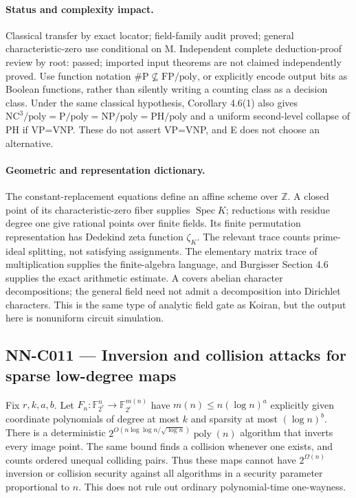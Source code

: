 \paragraph{Status and complexity impact.}
Classical transfer by exact locator; field-family audit proved; general characteristic-zero use conditional on M. Independent complete deduction-proof review by root: passed; imported input theorems are not claimed independently proved. Use function notation $\#\mathrm P\not\subseteq\mathrm{FP}/\mathrm{poly}$, or explicitly encode output bits as Boolean functions, rather than silently writing a counting class as a decision class. Under the same classical hypothesis, Corollary 4.6(1) also gives $\mathrm{NC}^3/\mathrm{poly}=\mathrm P/\mathrm{poly}=\mathrm{NP}/\mathrm{poly}=\mathrm{PH}/\mathrm{poly}$ and a uniform second-level collapse of PH if VP=VNP. These do not assert VP=VNP, and E does not choose an alternative.

\paragraph{Geometric and representation dictionary.}
The constant-replacement equations define an affine scheme over $\mathbb Z$. A closed point of its characteristic-zero fiber supplies $\operatorname{Spec}K$; reductions with residue degree one give rational points over finite fields. Its finite permutation representation has Dedekind zeta function $\zeta_K$. The relevant trace counts prime-ideal splitting, not satisfying assignments. The elementary matrix trace of multiplication supplies the finite-algebra language, and Burgisser Section 4.6 supplies the exact arithmetic estimate. A covers abelian character decompositions; the general field need not admit a decomposition into Dirichlet characters. This is the same type of analytic field gate as Koiran, but the output here is nonuniform circuit simulation.

\subsection{NN-C011 --- Inversion and collision attacks for sparse low-degree maps}
\begin{proposition}[NN-C011]
Fix $r,k,a,b$. Let $F_n:\mathbb F_{2^r}^n\to\mathbb F_{2^r}^{m(n)}$ have $m(n)\leq n(\log n)^a$ explicitly given coordinate polynomials of degree at most $k$ and sparsity at most $(\log n)^b$. There is a deterministic $2^{O(n\log\log n/\sqrt{\log n})}\operatorname{poly}(n)$ algorithm that inverts every image point. The same bound finds a collision whenever one exists, and counts ordered unequal colliding pairs. Thus these maps cannot have $2^{\Omega(n)}$ inversion or collision security against all algorithms in a security parameter proportional to $n$. This does not rule out ordinary polynomial-time one-wayness.
\end{proposition}
